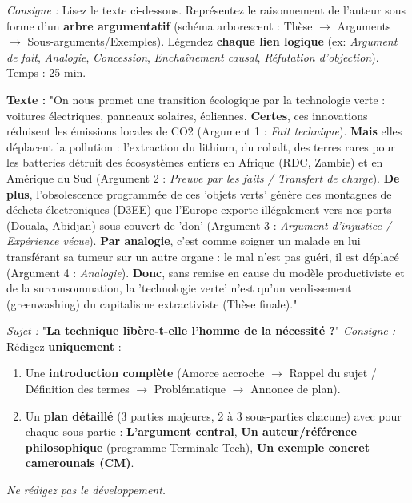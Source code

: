 \documentclass[11pt]{article}
\newcommand{\cle}[1]{{\popxbold\color{popdark}#1}}
\begin{document}
\begin{exercice}
\emph{Consigne :} Lisez le texte ci-dessous. Représentez le raisonnement de l'auteur sous forme d'un \textbf{arbre argumentatif} (schéma arborescent : Thèse $\rightarrow$ Arguments $\rightarrow$ Sous-arguments/Exemples). Légendez \textbf{chaque lien logique} (ex: \textit{Argument de fait}, \textit{Analogie}, \textit{Concession}, \textit{Enchaînement causal}, \textit{Réfutation d'objection}). Temps : 25 min.

\textbf{Texte :} "On nous promet une \cle{transition écologique} par la technologie verte : voitures électriques, panneaux solaires, éoliennes. \textbf{Certes}, ces innovations réduisent les émissions locales de CO2 (Argument 1 : \textit{Fait technique}). \textbf{Mais} elles déplacent la pollution : l'extraction du lithium, du cobalt, des terres rares pour les batteries détruit des écosystèmes entiers en Afrique (RDC, Zambie) et en Amérique du Sud (Argument 2 : \textit{Preuve par les faits / Transfert de charge}). \textbf{De plus}, l'obsolescence programmée de ces 'objets verts' génère des montagnes de déchets électroniques (D3EE) que l'Europe exporte illégalement vers nos ports (Douala, Abidjan) sous couvert de 'don' (Argument 3 : \textit{Argument d'injustice / Expérience vécue}). \textbf{Par analogie}, c'est comme soigner un malade en lui transférant sa tumeur sur un autre organe : le mal n'est pas guéri, il est déplacé (Argument 4 : \textit{Analogie}). \textbf{Donc}, sans remise en cause du \cle{modèle productiviste} et de la surconsommation, la 'technologie verte' n'est qu'un \cle{verdissement} (greenwashing) du capitalisme extractiviste (Thèse finale)."
\end{exercice}

\begin{exercice}
\emph{Sujet :} "\textbf{La technique libère-t-elle l'homme de la nécessité ?}"
\emph{Consigne :} Rédigez \textbf{uniquement} :
\begin{enumerate}
    \item Une \textbf{introduction complète} (Amorce \cle{accroche} $\rightarrow$ Rappel du sujet / Définition des termes $\rightarrow$ \cle{Problématique} $\rightarrow$ Annonce de \cle{plan}).
    \item Un \textbf{plan détaillé} (3 parties majeures, 2 à 3 sous-parties chacune) avec pour chaque sous-partie : \textbf{L'argument central}, \textbf{Un auteur/référence philosophique} (programme Terminale Tech), \textbf{Un exemple concret camerounais (CM)}.
\end{enumerate}
\emph{Ne rédigez pas le développement.}
\end{exercice}
\end{document}

